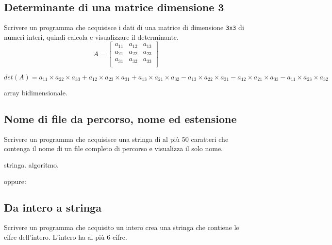 \subsection{Determinante di una matrice dimensione 3}

Scrivere un programma che acquisisce i dati di una matrice di dimensione \texttt{3x3} di numeri interi, quindi calcola e visualizzare il determinante.
\[
A = 
\begin{bmatrix}
a_{11} & a_{12} & a_{13} \\
a_{21} & a_{22} & a_{23} \\
a_{31} & a_{32} & a_{33} \\
\end{bmatrix}
\]

{\small
$$ det(A) = a_{11}\times a_{22}  \times a_{33}  + a_{12} \times a_{23}\times a_{31}  + a_{13} \times a_{21} \times a_{32} - a_{13} \times a_{22} \times a_{31} - a_{12} \times a_{21} \times a_{33} - a_{11} \times a_{23} \times a_{32} $$}

\begin{tags}
array bidimensionale.
\end{tags}

%

\subsection{Nome di file da percorso, nome ed estensione}
Scrivere un programma che acquisisce una stringa di al pi\`u 50 caratteri che contenga il nome di un file completo di percorso e visualizza il solo nome. 

\begin{tags}
stringa. algoritmo.
\end{tags}

\begin{esame}
\end{esame}


oppure:



\subsection{Da intero a stringa}
Scrivere un programma che acquisito un intero crea una stringa che contiene le cifre dell'intero. L'intero ha al pi\`u 6 cifre. 

